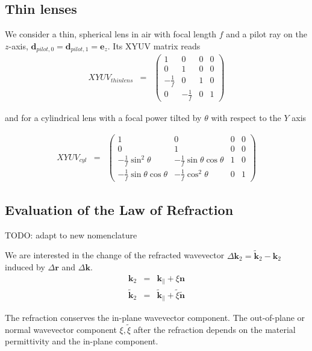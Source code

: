 \documentclass[12pt,a4paper,twoside,openright,BCOR10mm,headsepline,titlepage,abstracton,chapterprefix,final]{scrreprt}
\newcommand\Vector[1]{{\mathbf{#1}}}
\newcommand\wavenumber{k}
\newcommand\Wavevector{\Vector{\wavenumber}}
\begin{document}
\subsection{Thin lenses}
We consider a thin, spherical lens in air with focal length $f$
and a pilot ray on the $z$-axis, $\Vector{d}_{pilot,0} = \Vector{d}_{pilot,1} = \Vector{e}_{z}$.
Its XYUV matrix reads
\begin{eqnarray}
XYUV_{thin lens} &=&
 \begin{pmatrix}
  1 & 0 & 0 & 0 \\
  0 & 1 & 0 & 0 \\
  -\frac{1}{f} & 0 & 1 & 0 \\
  0 & -\frac{1}{f} & 0 & 1
 \end{pmatrix}
\end{eqnarray}

and for a cylindrical lens with a focal power tilted by $\theta$ with respect to the $Y$ axis

\begin{eqnarray}
XYUV_{cyl} &=&
 \begin{pmatrix}
  1 & 0 & 0 & 0 \\
  0 & 1 & 0 & 0 \\
  -\frac{1}{f} \sin^2\theta & -\frac{1}{f} \sin\theta \cos\theta & 1 & 0 \\
  -\frac{1}{f} \sin\theta \cos\theta & -\frac{1}{f} \cos^2\theta & 0 & 1
 \end{pmatrix}
\end{eqnarray}



\subsection{Evaluation of the Law of Refraction}



TODO: adapt to new nomenclature

We are interested in the change of the refracted wavevector $\Delta\Wavevector_2 = \tilde{\Wavevector}_2 - \Wavevector_2$ induced by $\Delta\Vector{r}$ and $\Delta\Wavevector$.
\begin{eqnarray}
 \Wavevector_2 &=& \Wavevector_{\parallel} + \xi \Vector{n} 
 \\
 \tilde{\Wavevector}_2 &=& \tilde{\Wavevector}_{\parallel} + \tilde{\xi} \tilde{\Vector{n}} 
\end{eqnarray}

The refraction conserves the in-plane wavevector component. 
The out-of-plane or normal wavevector component $\xi, \tilde{\xi}$ after the refraction depends on the material permittivity and the in-plane component.
\end{document}
